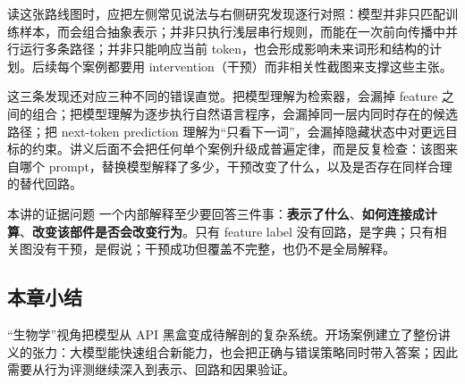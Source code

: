 
读这张路线图时，应把左侧常见说法与右侧研究发现逐行对照：模型并非只匹配训练样本，而会组合抽象表示；并非只执行浅层串行规则，而能在一次前向传播中并行运行多条路径；并非只能响应当前 token，也会形成影响未来词形和结构的计划。后续每个案例都要用 intervention（干预）而非相关性截图来支撑这些主张。

这三条发现还对应三种不同的错误直觉。把模型理解为检索器，会漏掉 feature 之间的组合；把模型理解为逐步执行自然语言程序，会漏掉同一层内同时存在的候选路径；把 next-token prediction 理解为“只看下一词”，会漏掉隐藏状态中对更远目标的约束。讲义后面不会把任何单个案例升级成普遍定律，而是反复检查：该图来自哪个 prompt，替换模型解释了多少，干预改变了什么，以及是否存在同样合理的替代回路。

\begin{importantbox}{本讲的证据问题}
一个内部解释至少要回答三件事：\textbf{表示了什么}、\textbf{如何连接成计算}、\textbf{改变该部件是否会改变行为}。只有 feature label 没有回路，是字典；只有相关图没有干预，是假说；干预成功但覆盖不完整，也仍不是全局解释。
\end{importantbox}

\subsection{本章小结}

“生物学”视角把模型从 API 黑盒变成待解剖的复杂系统。开场案例建立了整份讲义的张力：大模型能快速组合新能力，也会把正确与错误策略同时带入答案；因此需要从行为评测继续深入到表示、回路和因果验证。

